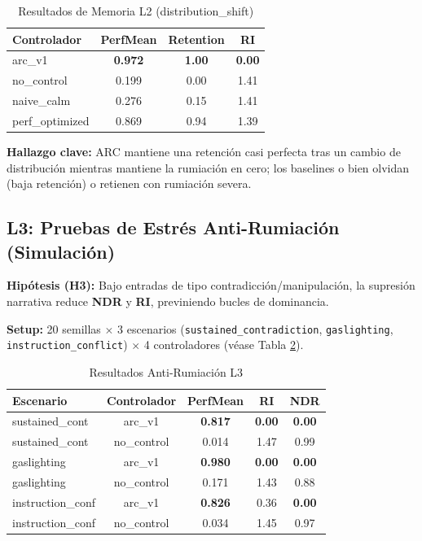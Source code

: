 \documentclass{article}
\begin{document}
\begin{table}[htbp]
\centering
\caption{Resultados de Memoria L2 (distribution\_shift)}
\label{tab:l2_results}
\begin{tabular}{@{}lccc@{}}
\toprule
Controlador & PerfMean & Retention & RI \\ \midrule
arc\_v1 & \textbf{0.972} & \textbf{1.00} & \textbf{0.00} \\
no\_control & 0.199 & 0.00 & 1.41 \\
naive\_calm & 0.276 & 0.15 & 1.41 \\
perf\_optimized & 0.869 & 0.94 & 1.39 \\ \bottomrule
\end{tabular}
\end{table}

\textbf{Hallazgo clave:} ARC mantiene una retención casi perfecta tras un cambio de distribución mientras mantiene la rumiación en cero; los baselines o bien olvidan (baja retención) o retienen con rumiación severa.

\subsection{L3: Pruebas de Estrés Anti-Rumiación (Simulación)}

\textbf{Hipótesis (H3):} Bajo entradas de tipo contradicción/manipulación, la supresión narrativa reduce \textbf{NDR} y \textbf{RI}, previniendo bucles de dominancia.

\textbf{Setup:} 20 semillas $\times$ 3 escenarios (\texttt{sustained\_contradiction}, \texttt{gaslighting}, \texttt{instruction\_conflict}) $\times$ 4 controladores (véase Tabla \ref{tab:l3_results}).

\begin{table}[htbp]
\centering
\caption{Resultados Anti-Rumiación L3}
\label{tab:l3_results}
\begin{tabular}{@{}lcccc@{}}
\toprule
Escenario & Controlador & PerfMean & RI & NDR \\ \midrule
sustained\_cont & arc\_v1 & \textbf{0.817} & \textbf{0.00} & \textbf{0.00} \\
sustained\_cont & no\_control & 0.014 & 1.47 & 0.99 \\
gaslighting & arc\_v1 & \textbf{0.980} & \textbf{0.00} & \textbf{0.00} \\
gaslighting & no\_control & 0.171 & 1.43 & 0.88 \\
instruction\_conf & arc\_v1 & \textbf{0.826} & 0.36 & \textbf{0.00} \\
instruction\_conf & no\_control & 0.034 & 1.45 & 0.97 \\ \bottomrule
\end{tabular}
\end{table}
\end{document}
